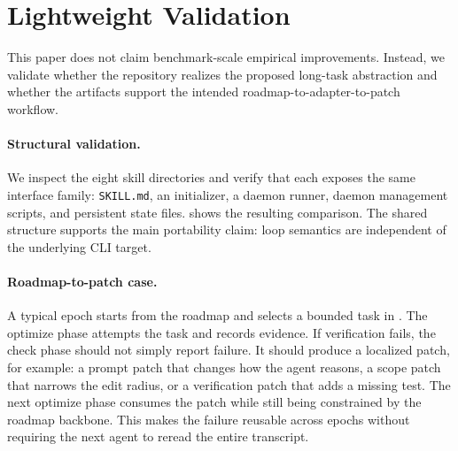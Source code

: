 \section{Lightweight Validation}
\label{sec:experiment}

This paper does not claim benchmark-scale empirical improvements. Instead, we validate whether the repository realizes the proposed long-task abstraction and whether the artifacts support the intended roadmap-to-adapter-to-patch workflow.

\paragraph{Structural validation.}
We inspect the eight skill directories and verify that each exposes the same interface family: \texttt{SKILL.md}, an initializer, a daemon runner, daemon management scripts, and persistent state files.  shows the resulting comparison. The shared structure supports the main portability claim: loop semantics are independent of the underlying CLI target.

\paragraph{Roadmap-to-patch case.}
A typical epoch starts from the roadmap and selects a bounded task in \activestate{}. The optimize phase attempts the task and records evidence. If verification fails, the check phase should not simply report failure. It should produce a localized patch, for example: a prompt patch that changes how the agent reasons, a scope patch that narrows the edit radius, or a verification patch that adds a missing test. The next optimize phase consumes the patch while still being constrained by the roadmap backbone. This makes the failure reusable across epochs without requiring the next agent to reread the entire transcript.

\begin{table}[t]
\centering
\small
{}
\caption{Lightweight ablation analysis of the reflective loop design.}
\label{tab:ablation}
\end{table}

